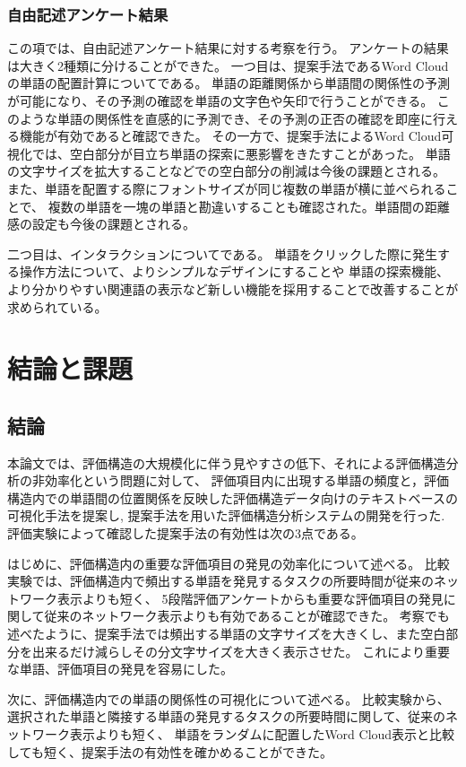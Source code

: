 \documentclass[syuuron]{kuee}
\begin{document}
		\subsection{自由記述アンケート結果}
		この項では、自由記述アンケート結果に対する考察を行う。
		アンケートの結果は大きく2種類に分けることができた。
		一つ目は、提案手法であるWord Cloudの単語の配置計算についてである。
		単語の距離関係から単語間の関係性の予測が可能になり、その予測の確認を単語の文字色や矢印で行うことができる。
		このような単語の関係性を直感的に予測でき、その予測の正否の確認を即座に行える機能が有効であると確認できた。
		その一方で、提案手法によるWord Cloud可視化では、空白部分が目立ち単語の探索に悪影響をきたすことがあった。
		単語の文字サイズを拡大することなどでの空白部分の削減は今後の課題とされる。
		また、単語を配置する際にフォントサイズが同じ複数の単語が横に並べられることで、
		複数の単語を一塊の単語と勘違いすることも確認された。単語間の距離感の設定も今後の課題とされる。
	
		二つ目は、インタラクションについてである。
		単語をクリックした際に発生する操作方法について、よりシンプルなデザインにすることや
		単語の探索機能、より分かりやすい関連語の表示など新しい機能を採用することで改善することが求められている。

\chapter{結論と課題}
	\section{結論}
		本論文では、評価構造の大規模化に伴う見やすさの低下、それによる評価構造分析の非効率化という問題に対して、
		評価項目内に出現する単語の頻度と，評価構造内での単語間の位置関係を反映した評価構造データ向けのテキストベースの可視化手法を提案し, 
		提案手法を用いた評価構造分析システムの開発を行った. 
		評価実験によって確認した提案手法の有効性は次の3点である。
		
		はじめに、評価構造内の重要な評価項目の発見の効率化について述べる。
		比較実験では、評価構造内で頻出する単語を発見するタスクの所要時間が従来のネットワーク表示よりも短く、
		5段階評価アンケートからも重要な評価項目の発見に関して従来のネットワーク表示よりも有効であることが確認できた。
		考察でも述べたように、提案手法では頻出する単語の文字サイズを大きくし、また空白部分を出来るだけ減らしその分文字サイズを大きく表示させた。
		これにより重要な単語、評価項目の発見を容易にした。
		
		次に、評価構造内での単語の関係性の可視化について述べる。
		比較実験から、選択された単語と隣接する単語の発見するタスクの所要時間に関して、従来のネットワーク表示よりも短く、
		単語をランダムに配置したWord Cloud表示と比較しても短く、提案手法の有効性を確かめることができた。
		
\end{document}
